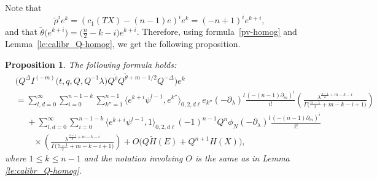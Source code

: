 \documentclass[10pt,a4paper]{article}
\numberwithin{equation}{section}
\newtheorem{Proposition}[Theorem]{Proposition}
\begin{document}
Note that
\[
\widetilde{\rho}^i e^k = (c_1(TX)-(n-1) e)^i e^k = (-n+1)^i e^{k+i},
\]
and that
$\widetilde{\theta}\big(e^{k+i}\big) = \big(\tfrac{n}{2}-k-i\big)
e^{k+i}$. Therefore, using formula~\eqref{pv-homog} and Lemma~\ref{le:calibr_Q-homog}, we get the following proposition.
\begin{Proposition}\label{prop:Q-exp_e}
The following formula holds:
\begin{align*}
&
\big( Q^\Delta
I^{(-m)}\big(t,q,Q, Q^{-1}\lambda\big)
Q^{\widetilde{\rho}} Q^{\widetilde{\theta}+m-1/2}
Q^{-\Delta} \big) e^k \\
&=
\sum_{l,d=0}^\infty\!
\sum_{i=0}^{n-1-k}\!
\sum_{k''=1}^{n-1}\!
\big\langle
e^{k+i} \psi^{l-1}, e^{k''}\big\rangle_{0,2,d\ell} e_{k''}
(-\partial_\lambda)^l \frac{(-(n-1)\partial_m)^i}{i!}\!
\left(
\frac{ \lambda^{\frac{n-1}{2}+ m-k-i} }{
\Gamma\big(\frac{n-1}{2}+ m-k-i+1\big) }
\right) \\
&\phantom{=}{}+
\sum_{l,d=0}^\infty
\sum_{i=0}^{n-1-k}
\big\langle
e^{k+i} \psi^{l-1}, 1\big\rangle_{0,2,d\ell} (-1)^{n-1}Q^n \phi_N
(-\partial_\lambda)^l \frac{(-(n-1)\partial_m)^i}{i!}
\\
&\phantom{=+}{}\times\left(
\frac{ \lambda^{\frac{n-1}{2}+ m-k-i} }{
\Gamma\big(\frac{n-1}{2}+ m-k-i+1\big) }
\right) +O\big(Q\widetilde{H}(E)+Q^{n+1}H(X)\big),
\end{align*}
where $1\leq k\leq n-1$ and the notation involving $O$ is the same as in Lemma {\rm\ref{le:calibr_Q-homog}}.
\end{Proposition}
\end{document}
